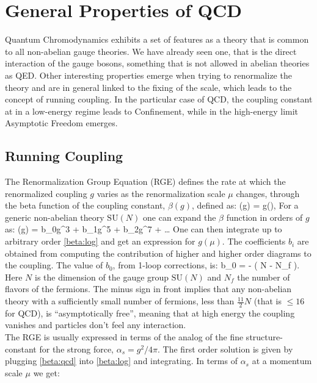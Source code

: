 \section{General Properties of QCD}
Quantum Chromodynamics exhibits a set of features as a theory that is common to all non-abelian gauge theories. We have already seen one, that is the direct interaction of the gauge bosons, something that is not allowed in abelian theories as QED. Other interesting properties emerge when trying to renormalize the theory and are in general linked to the fixing of the scale, which leads to the concept of running coupling. In the particular case of QCD, the coupling constant at in a low-energy regime leads to Confinement, while in the high-energy limit Asymptotic Freedom emerges. 

\subsection{Running Coupling} 
\label{sec:running_coupling}
The Renormalization Group Equation (RGE) defines the rate at which the renormalized coupling $g$ varies as the renormalization scale $\mu$ changes, through the beta function of the coupling constant, $\beta(g)$, defined as:
\beq
    \beta(g) = g(\mu),
    \label{beta:log}
\eeq 
For a generic non-abelian theory $\mathrm{SU}(N)$ one can expand the $\beta$ function in orders of $g$ as:
\beq
    \beta(g) = b_0g^3 + b_1g^5 + b_2g^7 + \dots   
\eeq
One can then integrate up to arbitrary order \cref{beta:log} and get an expression for $g(\mu)$. The coefficients $b_i$ are obtained from computing the contribution of higher and higher order diagrams to the coupling. The value of $b_0$, from 1-loop corrections, is:
\beq 
    b_0 = -  \left( N - N_f \right).
    \label{beta:qcd}
\eeq
Here $N$ is the dimension of the gauge group $\mathrm{SU}(N)$  and $N_f$ the number of flavors of the fermions. The minus sign in front implies that any non-abelian theory with a sufficiently small number of fermions, less than $\frac{11}{2}N$ (that is $\leq 16$ for QCD),  is ``asymptotically free'', meaning that at high energy the coupling vanishes and particles don't feel any interaction.\\
The RGE is usually expressed in terms of the analog of the fine structure-constant for the strong force, $\alpha_s = g^2/4\pi$. The first order solution is given by plugging \cref{beta:qcd} into \cref{beta:log} and integrating. In terms of $\alpha_s$ at a momentum scale $\mu$ we get: 
